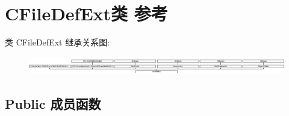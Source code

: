\hypertarget{class_c_file_def_ext}{}\section{C\+File\+Def\+Ext类 参考}
\label{class_c_file_def_ext}
类 C\+File\+Def\+Ext 继承关系图\+:\begin{figure}[H]
\begin{center}
\leavevmode
\includegraphics[height=0.795455cm]{class_c_file_def_ext}
\end{center}
\end{figure}
\subsection*{Public 成员函数}
